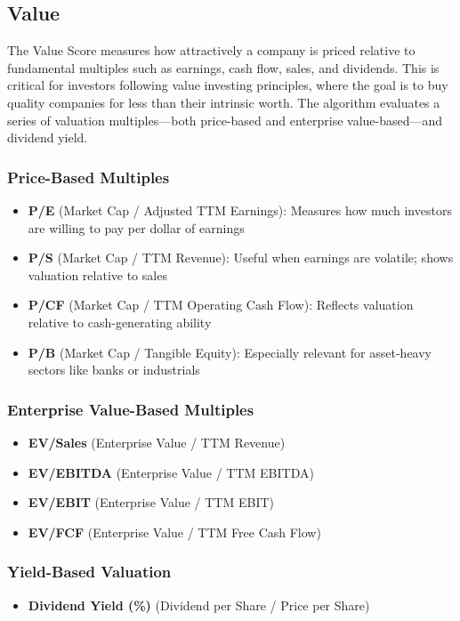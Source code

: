 \documentclass[11pt,english,a4paper,hidelinks]{book}
\begin{document}
\subsection{Value}
\noindent The Value Score measures how attractively a company is priced relative to fundamental multiples such as earnings, cash flow, sales, and dividends. This is critical for investors following value investing principles, where the goal is to buy quality companies for less than their intrinsic worth. The algorithm evaluates a series of valuation multiples—both price-based and enterprise value-based—and dividend yield.


\subsubsection{Price-Based Multiples}
\begin{itemize}
    \item \textbf{P/E} (Market Cap / Adjusted TTM Earnings): Measures how much investors are willing to pay per dollar of earnings
    \item \textbf{P/S} (Market Cap / TTM Revenue): Useful when earnings are volatile; shows valuation relative to sales
    \item \textbf{P/CF} (Market Cap / TTM Operating Cash Flow): Reflects valuation relative to cash-generating ability
    \item \textbf{P/B} (Market Cap / Tangible Equity): Especially relevant for asset-heavy sectors like banks or industrials
\end{itemize}

\subsubsection{Enterprise Value-Based Multiples}
\begin{itemize}
    \item \textbf{EV/Sales} (Enterprise Value / TTM Revenue)
    \item \textbf{EV/EBITDA} (Enterprise Value / TTM EBITDA)
    \item \textbf{EV/EBIT} (Enterprise Value / TTM EBIT)
    \item \textbf{EV/FCF} (Enterprise Value / TTM Free Cash Flow)
\end{itemize}

\subsubsection{Yield-Based Valuation}
\begin{itemize}
    \item \textbf{Dividend Yield (\%)} (Dividend per Share / Price per Share)
\end{itemize}
\end{document}
